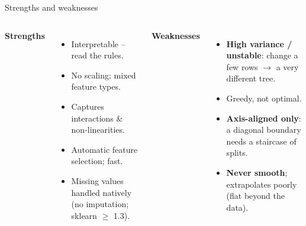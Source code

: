 \documentclass[aspectratio=169]{beamer}
\begin{document}
\begin{frame}{Strengths and weaknesses}
  \begin{columns}[T]
    \textbf{Strengths}
    \begin{itemize}\small
      \item Interpretable -- read the rules.
      \item No scaling; mixed feature types.
      \item Captures interactions \& non-linearities.
      \item Automatic feature selection; fast.
      \item Missing values handled natively (no imputation; sklearn $\ge$ 1.3).
    \end{itemize}
    \textbf{Weaknesses}
    \begin{itemize}\small
      \item \textbf{High variance / unstable}: change a few rows $\to$ a very different
        tree.
      \item Greedy, not optimal.
      \item \textbf{Axis-aligned only}: a diagonal boundary needs a staircase of splits.
      \item \textbf{Never smooth}; extrapolates poorly (flat beyond the data).
    \end{itemize}
  \end{columns}
  \vfill
\end{frame}
\end{document}
